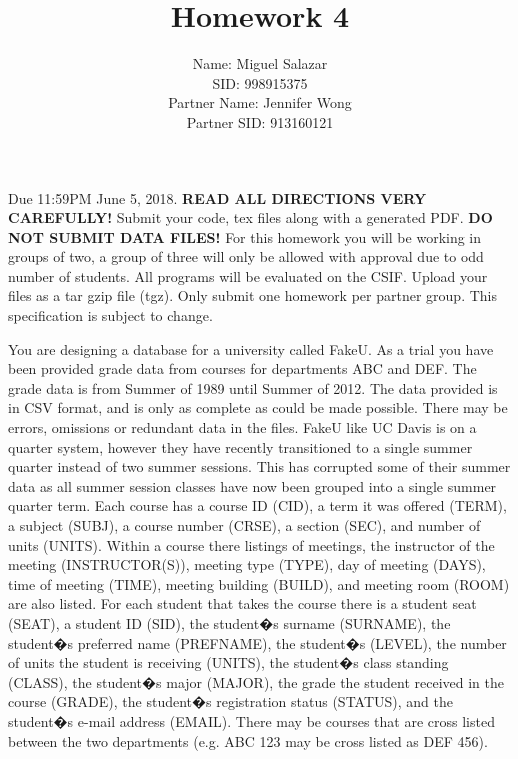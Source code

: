 \documentclass{article}
\begin{document}
\title{Homework 4}
\author{Name: Miguel Salazar\\SID: 998915375\\Partner Name: Jennifer Wong\\Partner SID: 913160121}

\maketitle

Due 11:59PM June 5, 2018. {\bf READ ALL DIRECTIONS VERY CAREFULLY!} 
Submit your code, tex files along with a generated PDF. {\bf DO NOT SUBMIT DATA FILES!} 
For this homework you will be working in groups of two, a group of three will only be allowed with approval due to odd number of students. 
All programs will be evaluated on the CSIF. Upload your files as a tar gzip file (tgz). Only submit one homework per partner group. This specification is subject to change.

You are designing a database for a university called FakeU. As a trial you have been provided grade data from courses for departments ABC and DEF. 
The grade data is from Summer of 1989 until Summer of 2012. The data provided is in CSV format, and is only as complete as could be made possible. 
There may be errors, omissions or redundant data in the files. 
FakeU like UC Davis is on a quarter system, however they have recently transitioned to a single summer quarter instead of two summer sessions. 
This has corrupted some of their summer data as all summer session classes have now been grouped into a single summer quarter term. 
Each course has a course ID (CID), a term it was offered (TERM), a subject (SUBJ), a course number (CRSE), a section (SEC), and number of units (UNITS). 
Within a course there listings of meetings, the instructor of the meeting (INSTRUCTOR(S)), meeting type (TYPE), day of meeting (DAYS), time of meeting (TIME), meeting building (BUILD), and meeting room (ROOM) are also listed. For each student that takes the course there is a student seat (SEAT), a student ID (SID), the student�s surname (SURNAME), the student�s preferred name (PREFNAME), the student�s (LEVEL), the number of units the student is receiving (UNITS), the student�s class standing (CLASS), the student�s major (MAJOR), the grade the student received in the course (GRADE), the student�s registration status (STATUS), and the student�s e-mail address (EMAIL).
There may be courses that are cross listed between the two departments (e.g. ABC 123 may be cross listed as DEF 456).
\end{document}
